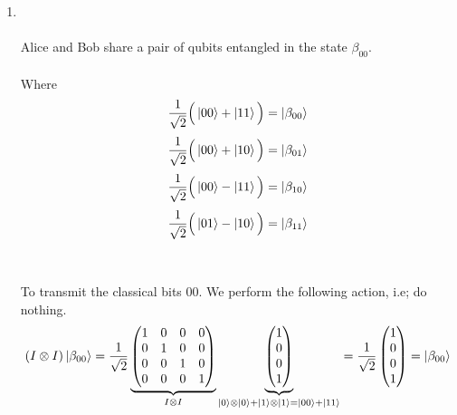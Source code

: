 \documentclass[a4paper,12pt]{article}
\begin{document}
\begin{enumerate}[label=(\alph*)]
    \item   \phantom{1}\\~\\
    Alice and Bob share a pair of qubits entangled in the state $\beta_{00}$. \\~\\
    Where \[\frac{1}{\sqrt{2}}\Big(\ket{00}+ \ket{11}\Big) = \ket{\beta_{00}}\]
    \[\frac{1}{\sqrt{2}}\Big(\ket{00} + \ket{10}\Big) = \ket{\beta_{01}}\]
    \[\frac{1}{\sqrt{2}}\Big(\ket{00}- \ket{11}\Big) = \ket{\beta_{10}}\]
    \[\frac{1}{\sqrt{2}}\Big(\ket{01}- \ket{10}\Big) = \ket{\beta_{11}}\] \\~\\
    To transmit the classical bits 00.
    We perform the following action, i.e; do nothing.
    \[(I \otimes I)\ket{\beta_{00}} = \frac{1}{\sqrt{2}} \underbrace{\begin{pmatrix}
        1 & 0 & 0 & 0 \\
        0 & 1 & 0 & 0 \\
        0 & 0 & 1 & 0 \\
        0 & 0 & 0 & 1 \\
    \end{pmatrix}}_{I \otimes I} \underbrace{\begin{pmatrix}
        1 \\
        0 \\
        0 \\
        1 \\
    \end{pmatrix}}_{\ket{0} \otimes \ket{0} + \ket{1} \otimes \ket{1} = \ket{00} +\ket{11}} = \frac{1}{\sqrt{2}}\begin{pmatrix}
        1 \\
        0 \\
        0 \\
        1 \\
    \end{pmatrix}  = \ket{\beta_{00}}\]


\end{enumerate}
\end{document}
